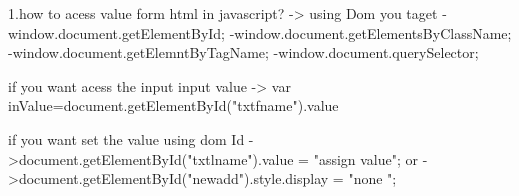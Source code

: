 1.how to acess value form html in javascript?
->  using Dom you taget
        -window.document.getElementById;
        -window.document.getElementsByClassName;
        -window.document.getElemntByTagName;
        -window.document.querySelector;

 if you want acess the input  input value
 -> var inValue=document.getElementById("txtfname").value   

if you want set the value using dom Id
->document.getElementById("txtlname").value = "assign value";
or
->document.getElementById("newadd").style.display = "none ";

